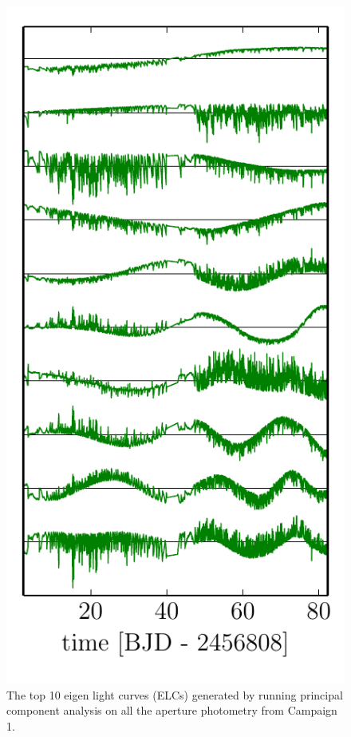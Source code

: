 \documentclass[12pt,preprint]{aastex}
\newcommand{\figlabel}[1]{\label{fig:#1}}
\begin{document}
\begin{figure}[p]
\begin{center}
\includegraphics{figures/pca.pdf}
\end{center}
\caption{%
The top 10 eigen light curves (ELCs) generated by running principal component
analysis on all the aperture photometry from Campaign 1.
\figlabel{pca}}
\end{figure}
\end{document}
